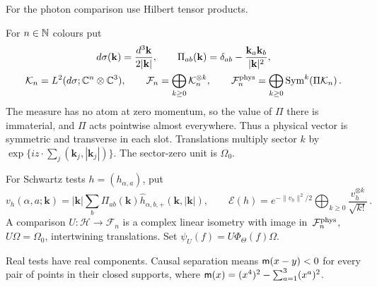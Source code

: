 For the photon comparison use Hilbert tensor products.
\begin{definition}\label{def:D29}
For $n\in\mathbb{N}$ colours put
\begin{gather*}
d\sigma(\mathbf k)=\frac{d^3\mathbf k}{2|\mathbf k|},\qquad
\Pi_{ab}(\mathbf k)=\delta_{ab}-\frac{\mathbf k_a\mathbf k_b}{|\mathbf k|^2},\\
\mathcal K_n=L^2(d\sigma;\mathbb{C}^n\otimes\mathbb{C}^3),\qquad
\mathcal F_n=\bigoplus_{k\ge0}\mathcal K_n^{\otimes k},\qquad
\mathcal F_n^{\rm phys}=\bigoplus_{k\ge0}\operatorname{Sym}^k(\Pi\mathcal K_n)\,.
\end{gather*}
The measure has no atom at zero momentum, so the value of $\Pi$ there is immaterial, and $\Pi$ acts pointwise almost everywhere. Thus a physical vector is symmetric and transverse in each slot. Translations multiply sector $k$ by $\exp\{iz\cdot\sum_j(\mathbf k_j,|\mathbf k_j|)\}$. The sector-zero unit is $\Omega_0$.
\end{definition}
\begin{definition}\label{def:D30}
For Schwartz tests $h=(h_{\alpha,a})$, put
\begin{equation*}
v_h(\alpha,a;\mathbf k)=|\mathbf k|\sum_b\Pi_{ab}(\mathbf k)\widehat h_{\alpha,b,+}(\mathbf k,|\mathbf k|),\qquad
\mathcal E(h)=e^{-\|v_h\|^2/2}\bigoplus_{k\ge0}\frac{v_h^{\otimes k}}{\sqrt{k!}}\,.
\end{equation*}
A comparison $U:\mathcal H\to\mathcal F_n$ is a complex linear isometry with image in~$\mathcal F_n^{\rm phys}$, $U\Omega=\Omega_0$, intertwining translations. Set $\psi_U(f)=U\Phi_\Theta(f)\Omega$.
\end{definition}
Real tests have real components. Causal separation means $\mathsf{m}(x-y)<0$ for every pair of points in their closed supports, where $\mathsf{m}(x)=(x^4)^2-\sum_{a=1}^3(x^a)^2$.

